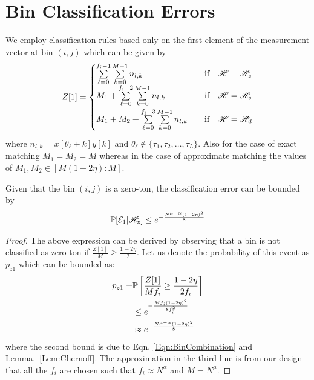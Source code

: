 \section{Bin Classification Errors}
We employ classification rules based only on the first element of the measurement vector at bin $(i,j)$ which can be given by
\begin{align}
Z[1]=\begin{cases}
\sum\limits_{\ell=0}^{f_{i}-1}\sum\limits_{k=0}^{M-1} n_{l,k}  & ~~\text{ if } ~~ \msc{H}=\msc{H}_z\label{Eqn:BinCombination}\\
\vspace{\vgap}
M_1+\sum\limits_{\ell=0}^{f_{i}-2}\sum\limits_{k=0}^{M-1} n_{l,k}  & ~~\text{ if } ~~ \msc{H}=\msc{H}_s\\
\vspace{\vgap}
M_1+M_2+\sum\limits_{\ell=0}^{f_{i}-3}\sum\limits_{k=0}^{M-1} n_{l,k}  & ~~\text{ if } ~~ \msc{H}=\msc{H}_d\\
\end{cases}
\end{align}
where $n_{l,k}=x[\theta_{\ell}+k]y[k]$ and $\theta_{\ell}\notin\{\tau_1,\tau_2,\ldots,\tau_L\}$. Also for the case of exact matching $M_1=M_2=M$ whereas in the case of approximate matching the values of $M_1,M_2\in[M(1-2\eta):M]$.

\begin{lemma}
\label{Lem:ZerotonClassif}
Given that the bin $(i,j)$ is a zero-ton, the classification error can be bounded by
\begin{align*}
\mathbb{P}[\mathcal{E}_1|\mathscr{H}_z]\leq e^{-\frac{N^{\mu-\alpha}(1-2\eta)^2}{8}}
\end{align*}
\end{lemma}
\begin{proof}
The above expression can be derived by observing that a bin is not classified as zero-ton if $\frac{Z[1]}{M}\geq\frac{1-2\eta}{2}$. Let us denote the probability of this event as $p_{z1}$ which can be bounded as:
\begin{align*}
p_{z1}=&\mathbb{P}\left[\frac{Z[1]}{Mf_i}\geq\frac{1-2\eta}{2f_i}\right]\\
&\leq e^{-\frac{Mf_i(1-2\eta)^2}{8f_i^{2}}}\\
&\approx e^{-\frac{N^{\mu-\alpha}(1-2\eta)^2}{8}}
\end{align*} 
where the second bound is due to Eqn. \eqref{Eqn:BinCombination} and Lemma.~\ref{Lem:Chernoff}. The approximation in the third line is from our design that all the $f_i$ are chosen such that $f_i\approx N^{\alpha}$ and $M=N^{\mu}.$
\end{proof}

